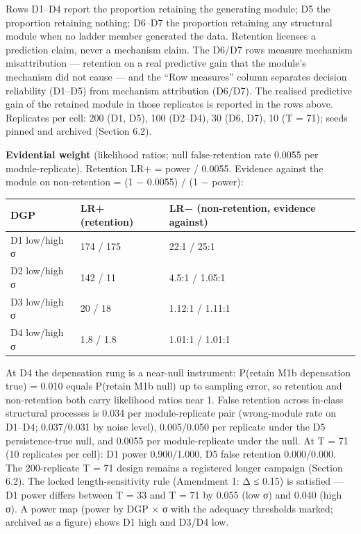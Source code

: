 \documentclass[11pt]{article}
\begin{document}
Rows D1--D4 report the proportion retaining the generating module; D5
the proportion retaining nothing; D6--D7 the proportion retaining any
structural module when no ladder member generated the data. Retention
licenses a prediction claim, never a mechanism claim. The D6/D7 rows
measure mechanism misattribution --- retention on a real predictive gain
that the module's mechanism did not cause --- and the ``Row measures''
column separates decision reliability (D1--D5) from mechanism
attribution (D6/D7). The realised predictive gain of the retained module
in those replicates is reported in the rows above. Replicates per cell:
200 (D1, D5), 100 (D2--D4), 30 (D6, D7), 10 (T = 71); seeds pinned and
archived (Section 6.2).

\textbf{Evidential weight} (likelihood ratios; null false-retention rate
0.0055 per module-replicate). Retention LR+ = power / 0.0055. Evidence
against the module on non-retention = (1 − 0.0055) / (1 − power):

{\def\LTcaptype{none} %
\begin{longtable}[]{@{}lll@{}}
\toprule\noalign{}
DGP & LR+ (retention) & LR− (non-retention, evidence against) \\
\midrule\noalign{}
\endhead
\bottomrule\noalign{}
\endlastfoot
D1 low/high σ & 174 / 175 & 22:1 / 25:1 \\
D2 low/high σ & 142 / 11 & 4.5:1 / 1.05:1 \\
D3 low/high σ & 20 / 18 & 1.12:1 / 1.11:1 \\
D4 low/high σ & 1.8 / 1.8 & 1.01:1 / 1.01:1 \\
\end{longtable}
}

At D4 the depensation rung is a near-null instrument: P(retain M1b
\textbar{} depensation true) = 0.010 equals P(retain M1b \textbar{}
null) up to sampling error, so retention and non-retention both carry
likelihood ratios near 1. False retention across in-class structural
processes is 0.034 per module-replicate pair (wrong-module rate on
D1--D4; 0.037/0.031 by noise level), 0.005/0.050 per replicate under the
D5 persistence-true null, and 0.0055 per module-replicate under the
null. At T = 71 (10 replicates per cell): D1 power 0.900/1.000, D5 false
retention 0.000/0.000. The 200-replicate T = 71 design remains a
registered longer campaign (Section 6.2). The locked length-sensitivity
rule (Amendment 1: \textbar Δ\textbar{} ≤ 0.15) is satisfied --- D1
power differs between T = 33 and T = 71 by 0.055 (low σ) and 0.040 (high
σ). A power map (power by DGP × σ with the adequacy thresholds marked;
archived as a figure) shows D1 high and D3/D4 low.
\end{document}
